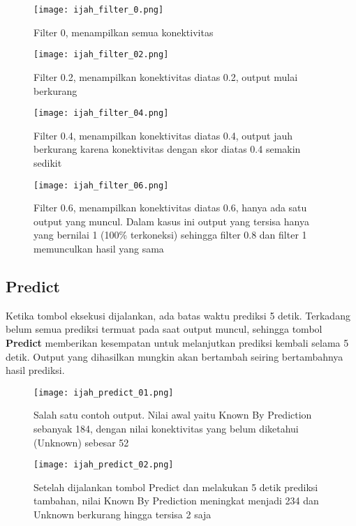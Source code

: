 	\begin{figure}[H]
	\centering
	\texttt{[image: ijah\_filter\_0.png]}
	\caption{Filter 0, menampilkan semua konektivitas}
	\label{fig:ijah_filter_0}
	\end{figure}

	\begin{figure}[H]
	\centering
	\texttt{[image: ijah\_filter\_02.png]}
	\caption{Filter 0.2, menampilkan konektivitas diatas 0.2, output mulai berkurang}
	\label{fig:ijah_filter_02}
	\end{figure}

	\begin{figure}[H]
	\centering
	\texttt{[image: ijah\_filter\_04.png]}
	\caption{Filter 0.4, menampilkan konektivitas diatas 0.4, output jauh berkurang karena konektivitas dengan skor diatas 0.4 semakin sedikit}
	\label{fig:ijah_filter_04}
	\end{figure}

	\begin{figure}[H]
	\centering
	\texttt{[image: ijah\_filter\_06.png]}
	\caption{Filter 0.6, menampilkan konektivitas diatas 0.6, hanya ada satu output yang muncul. Dalam kasus ini output yang tersisa hanya yang bernilai 1 (100\% terkoneksi) sehingga filter 0.8 dan filter 1 memunculkan hasil yang sama}
	\label{fig:ijah_filter_02}
	\end{figure}

	\subsection{Predict} \label{predictmore}
	Ketika tombol eksekusi dijalankan, ada batas waktu prediksi 5 detik. Terkadang belum semua prediksi termuat pada saat output muncul, sehingga tombol \textbf{Predict} memberikan kesempatan untuk melanjutkan prediksi kembali selama 5 detik. Output yang dihasilkan mungkin akan bertambah seiring bertambahnya hasil prediksi.

	\begin{figure}[H]
	\centering
	\texttt{[image: ijah\_predict\_01.png]}
	\caption{Salah satu contoh output. Nilai awal yaitu Known By Prediction sebanyak 184, dengan nilai konektivitas yang belum diketahui (Unknown) sebesar 52}
	\label{fig:ijah_predict_01}
	\end{figure}

	\begin{figure}[H]
	\centering
	\texttt{[image: ijah\_predict\_02.png]}
	\caption{Setelah dijalankan tombol Predict dan melakukan 5 detik prediksi tambahan, nilai Known By Prediction meningkat menjadi 234 dan Unknown berkurang hingga tersisa 2 saja}
	\label{fig:ijah_predict_02}
	\end{figure}
